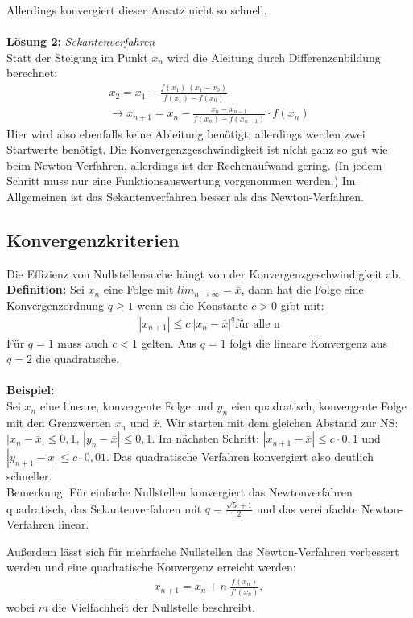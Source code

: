 \documentclass{scrartcl}
\begin{document}
Allerdings konvergiert dieser Ansatz nicht so schnell.\\
\\ 
\textbf{Lösung 2:} \textit{Sekantenverfahren} \\
Statt der Steigung im Punkt $x_n$ wird die Aleitung durch Differenzenbildung berechnet:
\begin{align*}
x_2=x_1-\frac{f(x_1) \ (x_1-x_0)}{f(x_1)-f(x_0)} \\
\rightarrow x_{n+1}=x_n-\frac{x_n-x_{n-1}}{f(x_n)-f(x_{n-1})} \cdot f(x_n)
\end{align*}
Hier wird also ebenfalls keine Ableitung benötigt; allerdings werden zwei Startwerte benötigt.
Die Konvergenzgeschwindigkeit ist nicht ganz so gut wie beim Newton-Verfahren, allerdings ist der Rechenaufwand gering. (In jedem Schritt muss nur eine Funktionsauswertung vorgenommen werden.)
Im Allgemeinen ist das Sekantenverfahren besser als das Newton-Verfahren.

\subsection{Konvergenzkriterien}
Die Effizienz von Nullstellensuche hängt von der Konvergenzgeschwindigkeit ab. \\
\textbf{Definition:} Sei $x_n$ eine Folge mit $lim_{n \rightarrow \infty}=\bar{x}$, dann hat die Folge eine Konvergenzordnung $q \geq 1$ wenn es die Konstante $c>0$ gibt mit:
\begin{align*}
|x_{n+1}| \leq c \ |x_n-\bar{x}|^q \text{für alle n}
\end{align*}
Für $q=1$ muss auch $c<1$ gelten.
Aus $q=1$ folgt die lineare Konvergenz aus $q=2$ die quadratische.\\
\\
\textbf{Beispiel:}\\
Sei $x_n$ eine lineare, konvergente Folge und $y_n$ eien quadratisch, konvergente Folge mit den Grenzwerten $x_n$ und $\bar{x}$.
Wir starten mit dem gleichen Abstand zur NS: $|x_n-\bar{x}|\leq 0,1$, $|y_n-\bar{x}|\leq 0,1$.
Im nächsten Schritt: $|x_{n+1}-\bar{x}| \leq c \cdot 0,1$ und $|y_{n+1}-\bar{x}| \leq c \cdot 0,01$.
Das quadratische Verfahren konvergiert also deutlich schneller.\\
Bemerkung: Für einfache Nullstellen konvergiert das Newtonverfahren quadratisch, das Sekantenverfahren mit $q=\frac{\sqrt{5}+1}{2}$ und das vereinfachte Newton-Verfahren linear.

Außerdem lässt sich für mehrfache Nullstellen das Newton-Verfahren verbessert werden und eine quadratische Konvergenz erreicht werden:
\begin{align*}
x_{n+1}=x_n + n \ \frac{f(x_n)}{f'(x_n)},
\end{align*}
wobei $m$ die Vielfachheit der Nullstelle beschreibt.
\end{document}
